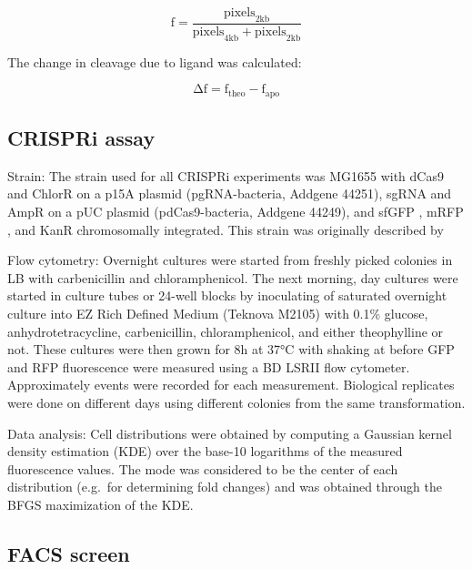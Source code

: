 \documentclass[10pt,oneside]{article}
\begin{document}
\begin{displaymath}
 \mathrm{f} = \frac{\mathrm{pixels}_\mathrm{2kb}}{\mathrm{pixels}_\mathrm{4kb} + \mathrm{pixels}_\mathrm{2kb}}
\end{displaymath}

The change in cleavage due to ligand was calculated: 

\begin{displaymath}
 \mathrm{Δf} = \mathrm{f}_\mathrm{theo} - \mathrm{f}_\mathrm{apo}
\end{displaymath}

\subsection{CRISPRi assay}

Strain: The strain used for all CRISPRi experiments was \ecoli{} MG1655 with dCas9 and ChlorR on a p15A plasmid (pgRNA-bacteria, Addgene 44251), sgRNA and AmpR on a pUC plasmid (pdCas9-bacteria, Addgene 44249), and sfGFP \autocite{pedelacq2006}, mRFP \autocite{campbell2002}, and KanR chromosomally integrated.  This strain was originally described by 

Flow cytometry: Overnight cultures were started from freshly picked colonies in  LB with  carbenicillin and  chloramphenicol.  The next morning, day cultures were started in  culture tubes or 24-well blocks by inoculating  of saturated overnight culture into  EZ Rich Defined Medium (Teknova M2105) with 0.1\% glucose,  an\-hydro\-tetra\-cycline,  carbenicillin,  chloramphenicol, and either  theophylline or not.  These cultures were then grown for 8h at 37°C with shaking at  before GFP and RFP fluorescence were measured using a BD LSRII flow cytometer.  Approximately \unit[10,000]{events} were recorded for each measurement.  Biological replicates were done on different days using different colonies from the same transformation.

Data analysis: Cell distributions were obtained by computing a Gaussian kernel density estimation (KDE) over the base-10 logarithms of the measured fluorescence values.  The mode was considered to be the center of each distribution (e.g.\ for determining fold changes) and was obtained through the BFGS maximization of the KDE.

\subsection{FACS screen}
\end{document}

